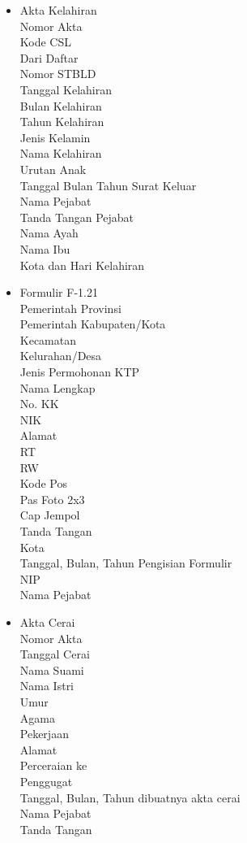\begin{itemize}
	\item Akta Kelahiran\\
		Nomor Akta\\
		Kode CSL\\
		Dari Daftar\\
		Nomor STBLD\\
		Tanggal Kelahiran\\
		Bulan Kelahiran\\
		Tahun Kelahiran\\
		Jenis Kelamin\\
		Nama Kelahiran\\
		Urutan Anak\\
		Tanggal Bulan Tahun Surat Keluar\\
		Nama Pejabat\\
		Tanda Tangan Pejabat\\
		Nama Ayah\\
		Nama Ibu\\
		Kota dan Hari Kelahiran
		
	\item Formulir F-1.21\\
		Pemerintah Provinsi\\
		Pemerintah Kabupaten/Kota\\
		Kecamatan\\
		Kelurahan/Desa\\
		Jenis Permohonan KTP\\
		Nama Lengkap\\
		No. KK\\
		NIK\\
		Alamat\\
		RT\\
		RW\\
		Kode Pos\\
		Pas Foto 2x3\\
		Cap Jempol\\
		Tanda Tangan\\
		Kota\\
		Tanggal, Bulan, Tahun Pengisian Formulir\\
		NIP\\
		Nama Pejabat

	\item Akta Cerai\\
		Nomor Akta\\
		Tanggal Cerai\\
		Nama Suami\\
		Nama Istri\\
		Umur\\
		Agama\\
		Pekerjaan\\
		Alamat\\
		Perceraian ke\\
		Penggugat\\
		Tanggal, Bulan, Tahun  dibuatnya akta cerai\\
		Nama Pejabat\\
		Tanda Tangan\\
\end{itemize}